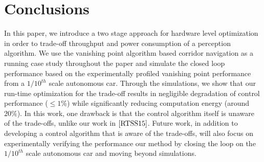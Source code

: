 \section{Conclusions}

In this paper, we introduce a two stage approach for hardware level optimization in order to trade-off throughput and power consumption of a perception algorithm. We use the vanishing point algorithm based corridor navigation as a running case study throughout the paper and simulate the closed loop performance based on the experimentally profiled vanishing point performance from a $1/10^{th}$ scale autonomous car. Through the simulations, we show that our run-time optimization for the trade-off results in negligible degradation of control performance ($\leq1\%$) while significantly reducing computation energy (around $20\%$). In this work, one drawback is that the control algorithm itself is unaware of the trade-offs, unlike our work in $\cite{RTSS15}$. Future work, in addition to developing a control algorithm that is aware of the trade-offs, will also focus on experimentally verifying the performance our method by closing the loop on the $1/10^{th}$ scale autonomous car and moving beyond simulations.
